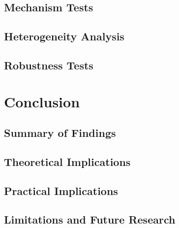 \documentclass[../main.tex]{subfiles}
\begin{document}
\subsection{Mechanism Tests}
\lipsum[17]

\subsection{Heterogeneity Analysis}
\lipsum[18]

\subsection{Robustness Tests}
\lipsum[19]

\section{Conclusion}\label{sec:ch1-conclusion}

\subsection{Summary of Findings}
\lipsum[20]

\subsection{Theoretical Implications}
\lipsum[21]

\subsection{Practical Implications}
\lipsum[22]

\subsection{Limitations and Future Research}
\lipsum[23]
\end{document}
